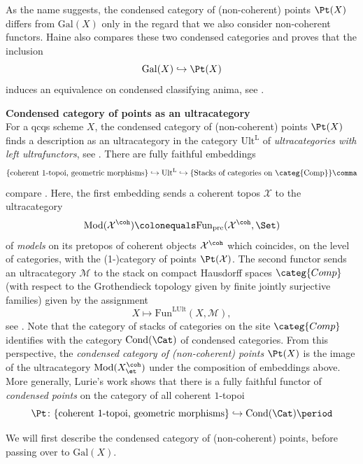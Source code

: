 \documentclass[leqno]{article}
\renewcommand{\Fun}{\mathrm{Fun}}
\renewcommand{\Gal}{\mathrm{Gal}}
\DeclareMathOperator{\Cond}{Cond}
\newcommand{\Comp}{\categ{Comp}}
\begin{document}
%
\begin{remark}
As the name suggests, the condensed category of (non-coherent) points $\Pt(X)$ differs from $\Gal(X)$ only in the regard that we also consider non-coherent functors. Haine also compares these two condensed categories and proves that the inclusion $$\Gal(X) \hookrightarrow \Pt(X)$$ induces an equivalence on condensed classifying anima, see \cite[Theorem 2.20]{Classifyinganima}.
\end{remark}
%
\begin{remark}{\textbf{Condensed category of points as an ultracategory}}\\
For a qcqs scheme $X$, the condensed category of (non-coherent) points $\Pt(X)$ finds a description as an ultracategory in the category $\mathrm{Ult^L}$ of \textit{ultracategories with left ultrafunctors}, see \cite[Definition 1.4.1]{Ultracategories}. There are fully faithful embeddings 
$$\{\text{coherent $1$-topoi, geometric morphisms}\} \hookrightarrow \mathrm{Ult^L} \hookrightarrow \{\text{Stacks of categories on \Comp}\}\comma$$
compare \cite[Remark 2.2.9., Remark 4.3.4]{Ultracategories}.
Here, the first embedding sends a coherent topos $\mathcal{X}$ to the ultracategory $$\mathrm{Mod}(\mathcal{X}^{\coh})\colonequals \Fun_{\mathrm{pre}}(\mathcal{X}^{\coh}, \Set)$$ of \textit{models} on its pretopos of coherent objects $\mathcal{X}^{\coh}$ which coincides, on the level of categories, with the (1-)category of points $\Pt(\mathcal{X})$.
The second functor sends an ultracategory $\mathcal{M}$ to the stack on compact Hausdorff spaces $\Comp$ (with respect to the Grothendieck topology given by finite jointly surjective families) given by the assignment
$$X\mapsto\Fun^{\mathrm{LUlt}}(X,\mathcal{M}) \comma$$ 
see \cite[Proposition 4.1.5]{Ultracategories}.
Note that the category of stacks of categories on the site $\Comp$ identifies with the category $\Cond(\Cat)$ of condensed categories. From this perspective, the \textit{condensed category of (non-coherent) points} $\Pt(X)$ is the image of the ultracategory $\mathrm{Mod}(X_{\et}^{\coh})$ under the composition of embeddings above. More generally, Lurie's work shows that there is a fully faithful functor of \textit{condensed points} on the category of all coherent $1$-topoi
\begin{equation}\label{eq:fullyfaithfulpoints}
\Pt \colon \{\text{coherent $1$-topoi, geometric morphisms}\} \hookrightarrow \Cond(\Cat)\period   
\end{equation}
\end{remark}
%
We will first describe the condensed category of (non-coherent) points, before passing over to $\Gal(X)$.
\end{document}
